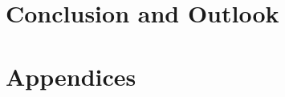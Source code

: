 \documentclass[11pt]{memoir} %
\begin{document}

%



\chapter[Conclusion and Outlook][Conclusion and Outlook]{Conclusion and Outlook}
\label{Chap:ConclusionAndOutlook}



\backmatter

 



\appendix 
{}

\chapter[Appendices][Appendices]{Appendices}

	
\end{document}
